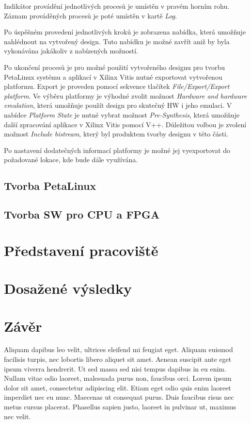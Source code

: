 \documentclass[a4paper, twoside, 11pt]{article}
\newcommand{\fbar}{\FloatBarrier}
\begin{document}
		Indikátor provádění jednotlivých procesů je umístěn v pravém horním rohu. Záznam prováděných procesů je poté umístěn v kartě \textit{Log}.\par
		Po úspěšném provedení jednotlivých kroků je zobrazena nabídka, která umožňuje nahlédnout na vytvořený design. Tuto nabídku je možné zavřít aniž by byla vykonávána jakákoliv z nabízených možností.\par
		Po ukončení procesů je pro možné použití vytvořeného designu pro tvorbu PetaLinux systému a aplikací v Xilinx Vitis nutné exportovat vytvořenou platformu. Export je proveden pomocí sekvence tlačítek \textit{File/Export/Export platform}. Ve výběru platformy je výhodné zvolit možnost \textit{Hardware and hardware emulation}, která umožňuje použít design pro skutečný HW i jeho emulaci. V nabídce \textit{Platform State} je nutné vybrat možnost \textit{Pre-Synthesis}, která umožňuje další zpracování aplikace v Xilinx Vitis pomocí V++. Důležitou volbou je zvolení možnost \textit{Include bistream}, který byl produktem tvorby designu v této části.\par
		Po nastavení dodatečných informací platformy je možné jej vyexportovat do požadované lokace, kde bude dále využívána.



	\fbar
	\subsection{Tvorba PetaLinux}
	\subsection{Tvorba SW pro CPU a FPGA}

\section{Představení pracoviště}
\section{Dosažené výsledky}


		
\newpage
{} 
\section*{Závěr}
Aliquam dapibus leo velit, ultrices eleifend mi feugiat eget. Aliquam euismod facilisis turpis, nec lobortis libero aliquet sit amet. Aenean suscipit ante eget ipsum viverra hendrerit. Ut sed massa sed nisi tempus dapibus in eu enim. Nullam vitae odio laoreet, malesuada purus non, faucibus orci. Lorem ipsum dolor sit amet, consectetur adipiscing elit. Etiam eget odio quis enim laoreet imperdiet nec eu nunc. Maecenas ut consequat purus. Duis faucibus risus nec metus cursus placerat. Phasellus sapien justo, laoreet in pulvinar ut, maximus nec velit.\par
	
\end{document}
